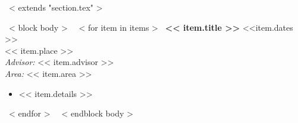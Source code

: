 ~< extends "section.tex" >~

~< block body >~
    ~< for item in items >~
	  {\bf << item.title >>} \hfill <<item.dates >>\\
	  {{ << item.place >>}}\\
	  {\it Advisor:} << item.advisor >>\\
	  {\it Area:} << item.area >>
	  \begin{itemize}
	  \item << item.details >>
	  \end{itemize}
	  \vspace{5mm}
    ~< endfor >~
~< endblock body >~
\vspace{-5mm}

